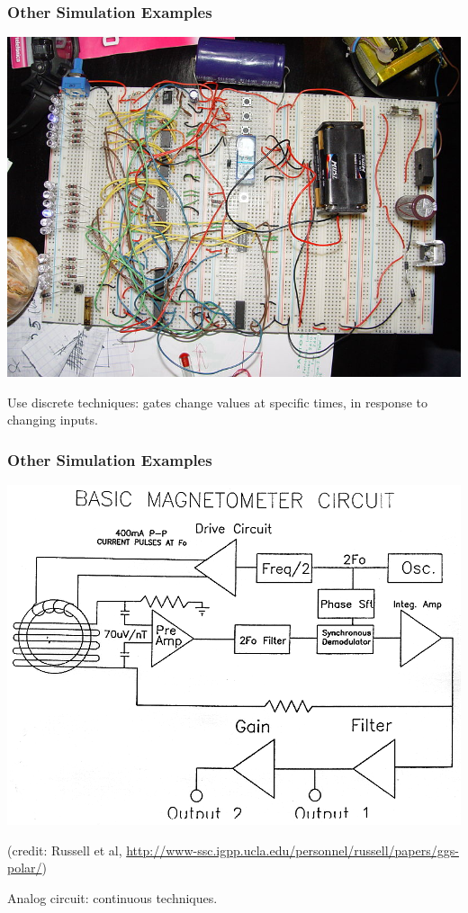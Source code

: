 \begin{frame}
\frametitle{Other Simulation Examples}
\begin{center}
\includegraphics[width=.7\textwidth]{images/800px-Relogio_binario}
\end{center}

\begin{changemargin}{1cm}
Use discrete techniques: gates change values at specific times,
in response to changing inputs.
\end{changemargin}
\end{frame}

\begin{frame}
\frametitle{Other Simulation Examples}
\begin{center}
\includegraphics[width=.7\textwidth]{images/fig6}

\hfill (credit: Russell et al, \url{http://www-ssc.igpp.ucla.edu/personnel/russell/papers/ggs-polar/})
\end{center}

\begin{changemargin}{1cm}
Analog circuit: continuous techniques.
\end{changemargin}
\end{frame}

